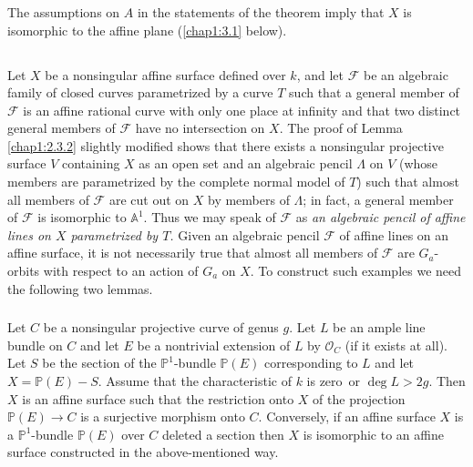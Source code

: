 \subsubsection{}\label{chap1:2.3.4}
The assumptions on $A$ in the statements of the theorem imply that $X$
is isomorphic to the affine plane (\cf \ref{chap1:3.1} below).

\subsection{}\label{chap1:2.4}
Let $X$ be a nonsingular affine surface defined over $k$, and let
$\mathscr{F}$ be an algebraic family of closed curves parametrized by
a curve $T$ such that a general member of $\mathscr{F}$ is an affine
rational curve with only one place at infinity and that two distinct
general members of $\mathscr{F}$ have no intersection on $X$. The
proof of Lemma \ref{chap1:2.3.2} slightly modified shows that there
exists a nonsingular projective surface $V$ containing $X$ as an open
set and an algebraic pencil $\Lambda$ on $V$ (whose members are
parametrized by the complete normal model of $T$) such that almost all
members of $\mathscr{F}$ are cut out on $X$ by members of $\Lambda$;
in fact, a general member of $\mathscr{F}$ is isomorphic to
$\mathbb{A}^{1}$. Thus we may speak of $\mathscr{F}$ as {\em an
  algebraic pencil of affine lines on $X$ parametrized by $T$.} Given
an algebraic pencil $\mathscr{F}$ of affine lines on an affine
surface, it is not necessarily true that almost all members of
$\mathscr{F}$ are $G_{a}$-orbits with respect to an action of $G_{a}$
on $X$. To construct such examples we need the following two lemmas.

\subsubsection{}\label{chap1:2.4.1}
\begin{lemma*}
Let $C$ be a nonsingular projective curve of genus $g$. Let $L$ be an
ample line bundle on $C$ and let $E$ be a nontrivial extension of $L$
by $\mathscr{O}_{C}$ (if it exists at all). Let $S$ be the section of
the $\mathbb{P}^{1}$-bundle $\mathbb{P}(E)$ corresponding to $L$ and
let $X=\mathbb{P}(E)-S$. Assume that the characteristic of $k$ is
zero\pageoriginale\ 
or $\deg L>2g$. Then $X$ is an affine surface such that the
restriction onto $X$ of the projection $\mathbb{P}(E)\to C$ is a
surjective morphism onto $C$. Conversely, if an affine surface $X$ is
a $\mathbb{P}^{1}$-bundle $\mathbb{P}(E)$ over $C$ deleted a section
then $X$ is isomorphic to an affine surface constructed in the
above-mentioned way.
\end{lemma*}

